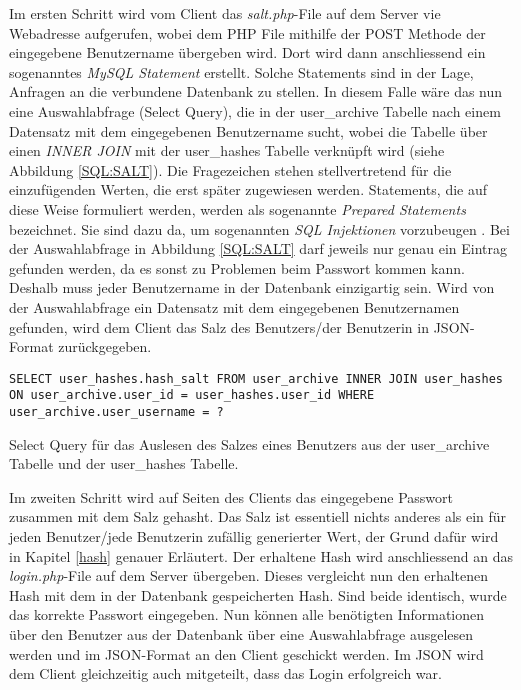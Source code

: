 \documentclass[../main.tex]{subfiles}
\begin{document}
	 Im ersten Schritt wird vom Client das \emph{salt.php}-File auf dem Server vie Webadresse aufgerufen, wobei dem PHP File mithilfe der POST Methode der eingegebene Benutzername übergeben wird. Dort wird dann anschliessend ein sogenanntes \emph{MySQL Statement} erstellt. Solche Statements sind in der Lage, Anfragen an die verbundene Datenbank zu stellen. In diesem Falle wäre das nun eine Auswahlabfrage (Select Query), die in der user\_archive Tabelle nach einem Datensatz mit dem eingegebenen Benutzername sucht, wobei die Tabelle über einen \emph{INNER JOIN} mit der user\_hashes Tabelle verknüpft wird (siehe Abbildung \ref{SQL:SALT}). Die Fragezeichen stehen stellvertretend für die einzufügenden Werten, die erst später zugewiesen werden. Statements, die auf diese Weise formuliert werden, werden als sogenannte \emph{Prepared Statements} bezeichnet. Sie sind dazu da, um sogenannten \emph{SQL Injektionen} vorzubeugen \cite{preparedstatement}. Bei der Auswahlabfrage in Abbildung \ref{SQL:SALT} darf jeweils nur genau ein Eintrag gefunden werden, da es sonst zu Problemen beim Passwort kommen kann. Deshalb muss jeder Benutzername in der Datenbank einzigartig sein. Wird von der Auswahlabfrage ein Datensatz mit dem eingegebenen Benutzernamen gefunden, wird dem Client das Salz des Benutzers/der Benutzerin in JSON-Format zurückgegeben. 
	 
	 \begin{code}
	 	\begin{center}
	 		\begin{verbatim}
SELECT user_hashes.hash_salt FROM user_archive INNER JOIN user_hashes ON user_archive.user_id = user_hashes.user_id WHERE user_archive.user_username = ?
	 		\end{verbatim}
	 		\caption{Select Query für das Auslesen des Salzes eines Benutzers aus der user\_archive Tabelle und der user\_hashes Tabelle.}\label{SQL:SALT}
	 	\end{center}
	 \end{code}
	 
	 Im zweiten Schritt wird auf Seiten des Clients das eingegebene Passwort zusammen mit dem Salz gehasht. Das Salz ist essentiell nichts anderes als ein für jeden Benutzer/jede Benutzerin zufällig generierter Wert, der Grund dafür wird in Kapitel \ref{hash} genauer Erläutert. Der erhaltene Hash wird anschliessend an das \emph{login.php}-File auf dem Server übergeben. Dieses vergleicht nun den erhaltenen Hash mit dem in der Datenbank gespeicherten Hash. Sind beide identisch, wurde das korrekte Passwort eingegeben. Nun können alle benötigten Informationen über den Benutzer aus der Datenbank über eine Auswahlabfrage ausgelesen werden und im JSON-Format an den Client geschickt werden. Im JSON wird dem Client gleichzeitig auch mitgeteilt, dass das Login erfolgreich war.
	 
\end{document}

